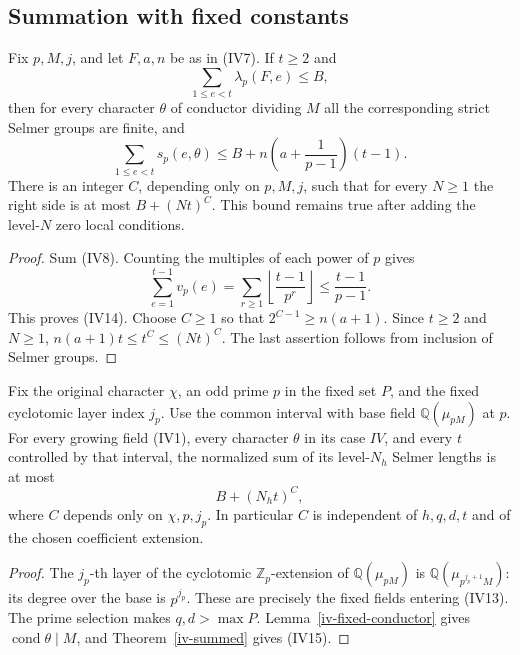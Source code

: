\subsection{Summation with fixed constants}

\begin{theorem}\label{iv-summed}
Fix $p,M,j$, and let $F,a,n$ be as in (IV7). If $t\ge2$
and
\[
                 \sum_{1\le e<t}\lambda_p(F,e)\le B,
                                                               \tag{IV13}
\]
then for every character $\theta$ of conductor dividing $M$
all the corresponding strict Selmer groups are finite, and
\[
 \sum_{1\le e<t}s_p(e,\theta)
 \le B+n\left(a+\frac1{p-1}\right)(t-1).
                                                               \tag{IV14}
\]
There is an integer $C$, depending only on $p,M,j$, such that
for every $N\ge1$ the right side is at most $B+(Nt)^C$.
This bound remains true after adding the level-$N$ zero
local conditions.
\end{theorem}
\begin{proof}
Sum (IV8). Counting the multiples of each power of $p$ gives
\[
 \sum_{e=1}^{t-1}v_p(e)
   =\sum_{r\ge1}\left\lfloor\frac{t-1}{p^r}\right\rfloor
   \le\frac{t-1}{p-1}.
\]
This proves (IV14). Choose $C\ge1$ so that
$2^{C-1}\ge n(a+1)$. Since $t\ge2$ and $N\ge1$,
$n(a+1)t\le t^C\le(Nt)^C$.
The last assertion follows from inclusion of Selmer groups.
\end{proof}

\begin{corollary}\label{iv-exact-case}
Fix the original character $\chi$, an odd prime $p$ in the
fixed set $P$, and the fixed cyclotomic layer index $j_p$.
Use the common interval with base field
$\mathbb Q(\mu_{pM})$ at $p$. For every growing field (IV1),
every character $\theta$ in its case $IV$, and every $t$
controlled by that interval, the normalized sum of its
level-$N_h$ Selmer lengths is at most
\[
                              B+(N_ht)^C,
                                                               \tag{IV15}
\]
where $C$ depends only on $\chi,p,j_p$.
In particular $C$ is independent of $h,q,d,t$ and of the
chosen coefficient extension.
\end{corollary}
\begin{proof}
The $j_p$-th layer of the cyclotomic $\mathbb Z_p$-extension
of $\mathbb Q(\mu_{pM})$ is
$\mathbb Q(\mu_{p^{j_p+1}M})$: its degree over the base is
$p^{j_p}$. These are precisely the fixed fields entering
(IV13). The prime selection makes $q,d>\max P$.
Lemma~\ref{iv-fixed-conductor} gives
$\operatorname{cond}\theta\mid M$, and
Theorem~\ref{iv-summed} gives (IV15).
\end{proof}

